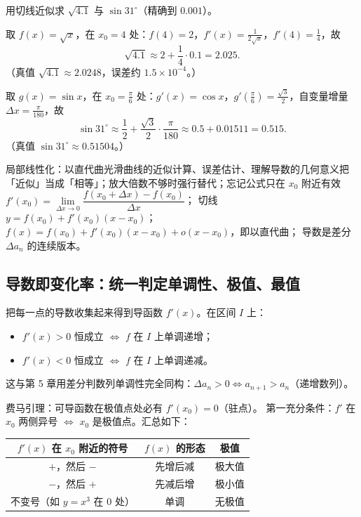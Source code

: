 \begin{explore}
\begin{example}
用切线近似求 $\sqrt{4.1}$ 与 $\sin31^\circ$（精确到 $0.001$）。
\end{example}
\begin{solution}
取 $f(x)=\sqrt x$，在 $x_0=4$ 处：$f(4)=2$，$f'(x)=\frac1{2\sqrt x}$，$f'(4)=\frac14$，故
\[
  \sqrt{4.1}\approx 2+\frac14\cdot0.1=2.025 .
\]
（真值 $\sqrt{4.1}\approx2.0248$，误差约 $1.5\times10^{-4}$。）

取 $g(x)=\sin x$，在 $x_0=\frac\pi6$ 处：$g'(x)=\cos x$，$g'\!\left(\frac\pi6\right)=\frac{\sqrt3}{2}$，自变量增量
$\Delta x=\frac\pi{180}$，故
\[
  \sin31^\circ\approx \frac12+\frac{\sqrt3}{2}\cdot\frac{\pi}{180}
  \approx0.5+0.01511=0.515 .
\]
（真值 $\sin31^\circ\approx0.51504$。）
\end{solution}

\begin{conccard}[一级]{局部线性化：以直代曲}{光滑曲线的近似计算、误差估计、理解导数的几何意义}{把「近似」当成「相等」；放大倍数不够时强行替代；忘记公式只在 $x_0$ 附近有效}
$f'(x_0)=\lim\limits_{\Delta x\to0}\dfrac{f(x_0+\Delta x)-f(x_0)}{\Delta x}$；
切线 $y=f(x_0)+f'(x_0)(x-x_0)$；
$f(x)=f(x_0)+f'(x_0)(x-x_0)+o(x-x_0)$，即以直代曲；
导数是差分 $\Delta a_n$ 的连续版本。
\end{conccard}

\subsection{导数即变化率：统一判定单调性、极值、最值}


把每一点的导数收集起来得到导函数 $f'(x)$。在区间 $I$ 上：
\begin{itemize}
  \item $f'(x)>0$ 恒成立 $\iff$ $f$ 在 $I$ 上单调递增；
  \item $f'(x)<0$ 恒成立 $\iff$ $f$ 在 $I$ 上单调递减。
\end{itemize}
这与第 5 章用差分判数列单调性完全同构：$\Delta a_n>0\iff a_{n+1}>a_n$（递增数列）。

费马引理：可导函数在极值点处必有 $f'(x_0)=0$（驻点）。
第一充分条件：$f'$ 在 $x_0$ 两侧异号 $\iff$ $x_0$ 是极值点。汇总如下：

\begin{center}\footnotesize\renewcommand{\arraystretch}{1.3}
\begin{tabular}{c|c|c}
$f'(x)$ 在 $x_0$ 附近的符号 & $f(x)$ 的形态 & 极值 \\\hline
$+$，然后 $-$ & 先增后减 & 极大值 \\
$-$，然后 $+$ & 先减后增 & 极小值 \\
不变号（如 $y=x^3$ 在 $0$ 处） & 单调 & 无极值 \\
\end{tabular}
\end{center}


\end{explore}
